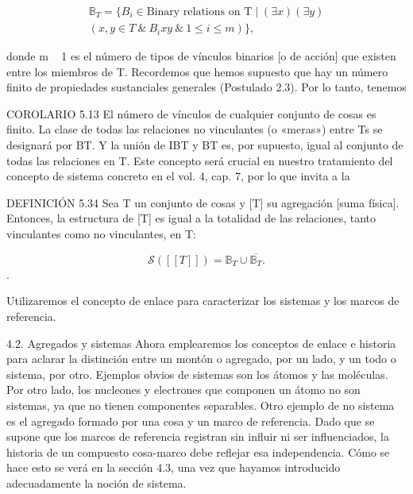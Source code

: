 \begin{justifying}
    \begin{center}
        \[
        \begin{gathered}
        \mathbb{B}_{T} = \{ B_{i} \in \text{Binary relations on T} \mid (\exists x)(\exists y) \\
        (x, y \in T \ \& \ B_{i}xy \ \& \ 1 \le i \le m) \},
        \end{gathered}
        \]
    \end{center}

    donde m ~ 1 es el número de tipos de vínculos binarios [o de acción] que existen
    entre los miembros de T.
    Recordemos que hemos supuesto que hay un número finito de propiedades sustanciales generales
    (Postulado 2.3). Por lo tanto, tenemos

    COROLARIO 5.13 El número de vínculos de cualquier conjunto de cosas es finito.
    La clase de todas las relaciones no vinculantes (o «meras») entre Ts se
    designará por BT. Y la unión de IBT y BT es, por supuesto, igual al conjunto de
    todas las relaciones en T. Este concepto será crucial en nuestro tratamiento del
    concepto de sistema concreto en el vol. 4, cap. 7, por lo que invita a la
    
    DEFINICIÓN 5.34 Sea T un conjunto de cosas y [T] su agregación
    [suma física]. Entonces, la estructura de [T] es igual a la totalidad de las relaciones,
    tanto vinculantes como no vinculantes, en T:

    \begin{center}
        \[ \mathcal{S}([[T]]) = \mathbb{B}_{T} \cup \overline{\mathbb{B}_{T}}. \].
    \end{center}

    Utilizaremos el concepto de enlace para caracterizar los sistemas y los
    marcos de referencia.

    4.2. Agregados y sistemas
    Ahora emplearemos los conceptos de enlace e historia para aclarar la
    distinción entre un montón o agregado, por un lado, y un todo
    o sistema, por otro. Ejemplos obvios de sistemas son los átomos y las
    moléculas. Por otro lado, los nucleones y electrones que componen un
    átomo no son sistemas, ya que no tienen componentes separables.
    Otro ejemplo de no sistema es el agregado formado por una cosa y
    un marco de referencia. Dado que se supone que los marcos de referencia registran
    sin influir ni ser influenciados, la historia de un compuesto cosa-marco debe reflejar esa independencia. Cómo se hace esto se
    verá en la sección 4.3, una vez que hayamos introducido adecuadamente la noción de
    sistema.


\end{justifying}
